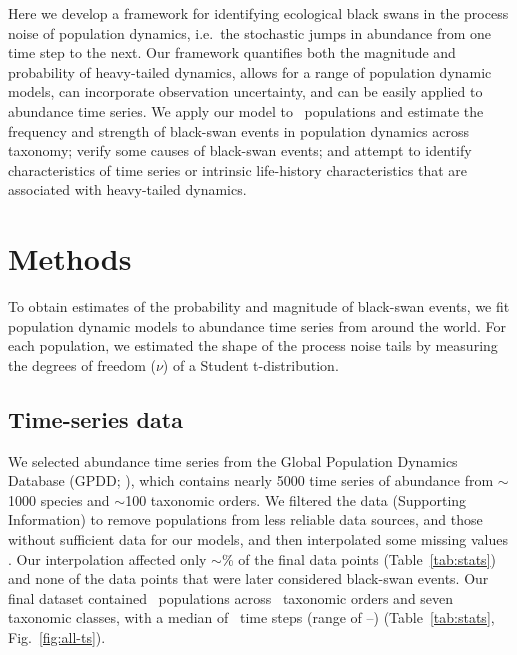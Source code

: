 Here we develop a framework for identifying ecological black swans in the
process noise of population dynamics, i.e.\ the stochastic jumps in abundance
from one time step to the next. Our framework quantifies both the magnitude and
probability of heavy-tailed dynamics, allows for a range of population dynamic
models, can incorporate observation uncertainty, and can be easily applied to
abundance time series. We apply our model to \NPops\ populations and estimate
the frequency and strength of black-swan events in population dynamics across
taxonomy; verify some causes of black-swan events; and attempt to identify
characteristics of time series or intrinsic life-history characteristics that
are associated with heavy-tailed dynamics.

\section{Methods}

To obtain estimates of the probability and magnitude of black-swan events, we
fit population dynamic models to abundance time series from around the world.
For each population, we estimated the shape of the process noise tails by
measuring the degrees of freedom ($\nu$) of a Student t-distribution.

\subsection{Time-series data}

We selected abundance time series from the Global Population Dynamics Database
(GPDD; \citeauthor{gpdd2010} \citeyear{gpdd2010}), which contains nearly 5000
time series of abundance from $\sim$1000 species and $\sim$100 taxonomic
orders. We filtered the data (Supporting Information) to remove populations
from less reliable data sources, and those without sufficient data for our
models, and then interpolated some missing values
\citep[\textit{sensu}][]{brook2006a}. Our interpolation affected only
$\sim$\interpPointsPerc \% of the final data points (Table~\ref{tab:stats})
and none of the data points that were later considered black-swan events. Our
final dataset contained \NPops~populations across \NOrders~taxonomic orders
and seven taxonomic classes, with a median of \medianTimeSteps~time steps
(range of \minTimeSteps--\maxTimeSteps) (Table~\ref{tab:stats},
Fig.~\ref{fig:all-ts}).

